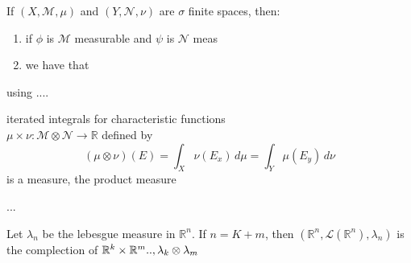 \begin{theorem}
    If \(\left(X, \mathcal{M}, \mu \right)\) and \(\left(Y, \mathcal{N}, \nu \right)\) are \(\sigma\) finite spaces, then:
    \begin{enumerate}
        \item if \(\phi\) is \(\mathcal{M}\) measurable and \(\psi\) is \( \mathcal{N}\) meas
        \item we have that 
    \end{enumerate}

 \end{theorem}
using ....

\begin{theorem}
    iterated integrals for characteristic functions \\ 
    \(\mu \times \nu : \mathcal{M} \otimes \mathcal{N} \rightarrow \mathbb{R} \) defined by
    \[ \left(\mu \otimes \nu \right)(E) = \int_X \nu(E_x) \, d\mu = \int_Y \mu(E_y) \, d\nu\]
    is a measure, the product measure 
\end{theorem}

...
\begin{theorem}
    Let \(\lambda_n\) be the lebesgue measure in \(\mathbb{R}^n\). If \(n= K+m\), then \(\left(\mathbb{R}^n, \mathcal{L}(\mathbb{R}^n), \lambda_n \right)\) is the complection of \(\mathbb{R}^k \times \mathbb{R}^m .., \lambda_k \otimes \lambda_m\)
\end{theorem}
